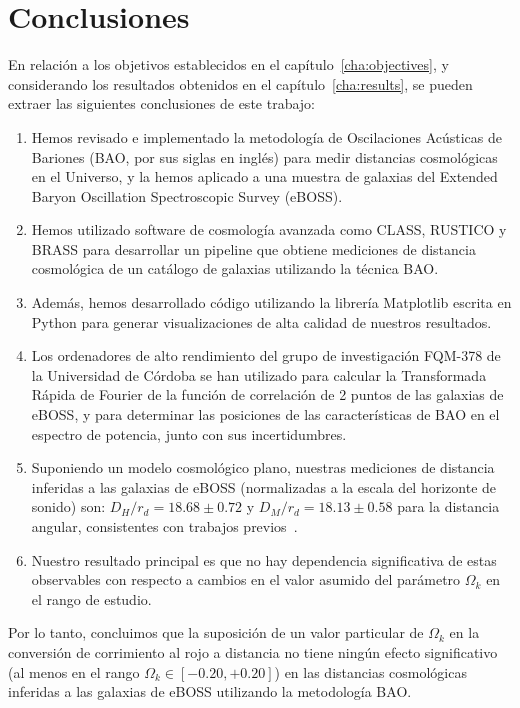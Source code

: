 \chapter*{Conclusiones}

En relación a los objetivos establecidos en el capítulo~\ref{cha:objectives}, y considerando los resultados obtenidos en el capítulo~\ref{cha:results}, se pueden extraer las siguientes conclusiones de este trabajo:

\begin{enumerate}
\item Hemos revisado e implementado la metodología de Oscilaciones Acústicas de Bariones (BAO, por sus siglas en inglés) para medir distancias cosmológicas en el Universo, y la hemos aplicado a una muestra de galaxias del Extended Baryon Oscillation Spectroscopic Survey (eBOSS).
\item Hemos utilizado software de cosmología avanzada como CLASS, RUSTICO y BRASS para desarrollar un pipeline que obtiene mediciones de distancia cosmológica de un catálogo de galaxias utilizando la técnica BAO.
\item Además, hemos desarrollado código utilizando la librería Matplotlib escrita en Python para generar visualizaciones de alta calidad de nuestros resultados.
\item Los ordenadores de alto rendimiento del grupo de investigación FQM-378 de la Universidad de Córdoba se han utilizado para calcular la Transformada Rápida de Fourier de la función de correlación de 2 puntos de las galaxias de eBOSS, y para determinar las posiciones de las características de BAO en el espectro de potencia, junto con sus incertidumbres.
\item Suponiendo un modelo cosmológico plano, nuestras mediciones de distancia inferidas a las galaxias de eBOSS (normalizadas a la escala del horizonte de sonido) son: $D_H/r_d = 18.68 \pm 0.72$ y $D_M/r_d = 18.13 \pm 0.58$ para la distancia angular, consistentes con trabajos previos~\cite{hector}.
\item Nuestro resultado principal es que no hay dependencia significativa de estas observables con respecto a cambios en el valor asumido del parámetro $ \Omega_k$ en el rango de estudio.
\end{enumerate}

Por lo tanto, concluimos que la suposición de un valor particular de $\Omega_k$ en la conversión de corrimiento al rojo a distancia no tiene ningún efecto significativo (al menos en el rango $\Omega_k \in [-0.20, +0.20]$) en las distancias cosmológicas inferidas a las galaxias de eBOSS utilizando la metodología BAO.

